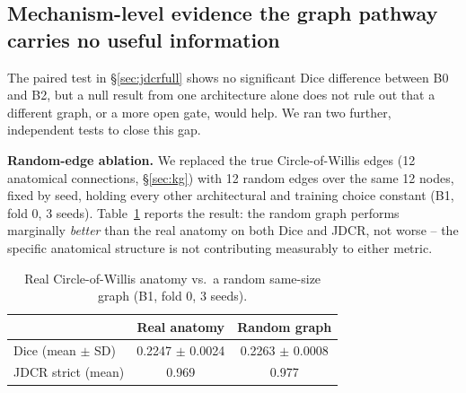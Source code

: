 

\subsection{Mechanism-level evidence the graph pathway carries no useful information}
\label{sec:mechanism}

The paired test in \S\ref{sec:jdcrfull} shows no significant Dice difference between B0 and B2, but a null result from one architecture alone does not rule out that a different graph, or a more open gate, would help. We ran two further, independent tests to close this gap.

\textbf{Random-edge ablation.} We replaced the true Circle-of-Willis edges (12 anatomical connections, \S\ref{sec:kg}) with 12 random edges over the same 12 nodes, fixed by seed, holding every other architectural and training choice constant (B1, fold 0, 3 seeds). Table~\ref{tab:randomedge} reports the result: the random graph performs marginally \emph{better} than the real anatomy on both Dice and JDCR, not worse -- the specific anatomical structure is not contributing measurably to either metric.

\begin{table}[t]
\centering
\caption{Real Circle-of-Willis anatomy vs.\ a random same-size graph (B1, fold 0, 3 seeds).}
\label{tab:randomedge}
\begin{tabular}{lcc}
\toprule
& \textbf{Real anatomy} & \textbf{Random graph} \\
\midrule
Dice (mean $\pm$ SD) & 0.2247 $\pm$ 0.0024 & 0.2263 $\pm$ 0.0008 \\
JDCR strict (mean) & 0.969 & 0.977 \\
\bottomrule
\end{tabular}
\end{table}

